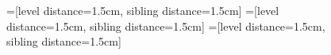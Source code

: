 \begin{figure}[ht]
  \centering
  =[level distance=1.5cm, sibling distance=1.5cm]
  =[level distance=1.5cm, sibling distance=1.5cm]
  =[level distance=1.5cm, sibling distance=1.5cm]

  \hspace{-0.175\linewidth}%
  \begin{subfigure}[b]{0.25\linewidth}
    \begin{subfigure}[t]{\columnwidth}
      \centering
      \caption{}
    \end{subfigure} \\\vspace{3em}


\end{subfigure}
\end{figure}
